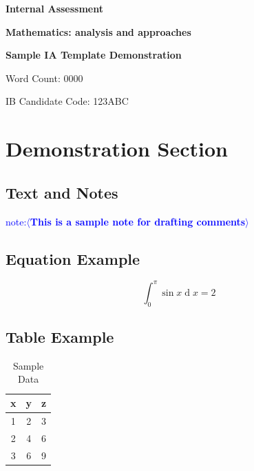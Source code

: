 \documentclass[12pt, a4paper]{article}
\newcommand{\note}[1]{%
    \textcolor{blue}{note:$\langle$\textbf{#1}$\rangle$}%
}
\DeclareMathOperator{\diff}{d}
\begin{document}
\begin{titlepage}
    \centering
    \vspace*{2cm}
    
    {\Large \textbf{Internal Assessment}\par}
    {\large \textbf{Mathematics: analysis and approaches}\par}
    \vspace{1.5cm}
    
    {\normalsize \textbf{Sample IA Template Demonstration}\par}
    \vspace{2cm}
    
    {\normalsize Word Count: 0000\par}
    \vspace{1cm}

    {\normalsize IB Candidate Code: 123ABC\par}
\end{titlepage}

\tableofcontents
\newpage

\section{Demonstration Section}

\subsection{Text and Notes}
\lipsum[1]

\note{This is a sample note for drafting comments}

\subsection{Equation Example}
\begin{equation}
    \int_{0}^{\pi} \sin{x} \diff{x} = 2
\end{equation}

\subsection{Table Example}
\begin{table}[H]
\centering
\caption{Sample Data}
\begin{tabular}{ccc}
\toprule
x & y & z \\
\midrule
1 & 2 & 3 \\
2 & 4 & 6 \\
3 & 6 & 9 \\
\bottomrule
\end{tabular}
\end{table}
\end{document}
